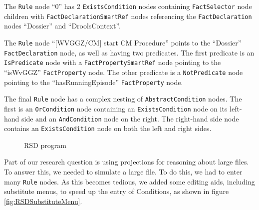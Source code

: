 The \texttt{Rule} node ``0'' has 2 \texttt{ExistsCondition} nodes containing \texttt{FactSelector} node children with \linebreak\texttt{FactDeclarationSmartRef} nodes referencing the \texttt{FactDeclaration} nodes ``Dossier'' and ``DroolsContext''.

The \texttt{Rule} node ``[WVGGZ/CM] start CM Procedure'' points to the ``Dossier'' \texttt{FactDeclaration} node, as well as having two predicates.
The first predicate is an \texttt{IsPredicate} node with a \texttt{FactPropertySmartRef} node pointing to the ``isWvGGZ'' \texttt{FactProperty} node.
The other predicate is a \texttt{NotPredicate} node pointing to the ``hasRunningEpisode'' \texttt{FactProperty} node.

The final \texttt{Rule} node has a complex nesting of \texttt{AbstractCondition} nodes.
The first is an \texttt{OrCondition} node containing an \texttt{ExistsCondition} node on its left-hand side and an \texttt{AndCondition} node on the right.
The right-hand side node contains an \texttt{ExistsCondition} node on both the left and right sides. 

\begin{figure}[h]
    \centering
    \caption{RSD program}
    \label{fig:RSDProgram}
\end{figure}

\newpage

Part of our research question is using projections for reasoning about large files.
To answer this, we needed to simulate a large file.
To do this, we had to enter many \texttt{Rule} nodes.
As this becomes tedious, we added some editing aids, including substitute menus, to speed up the entry of Conditions, as shown in figure \ref{fig:RSDSubstituteMenu}.

